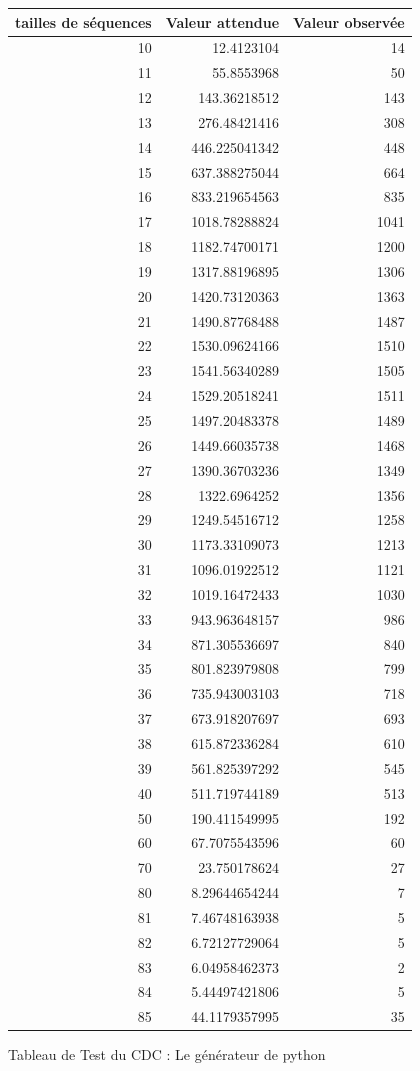 \documentclass[10pt,a4paper]{article}
\begin{document}
\newpage

\begin{figure}[h]
\centering
\begin{tabular}{|r|r|r|}
\hline
tailles de séquences & Valeur attendue & Valeur observée\\
\hline
10 & 12.4123104 & 14\\
11 & 55.8553968 & 50\\
12 & 143.36218512 & 143\\
13 & 276.48421416 & 308\\
14 & 446.225041342 & 448\\
15 & 637.388275044 & 664\\
16 & 833.219654563 & 835\\
17 & 1018.78288824 & 1041\\
18 & 1182.74700171 & 1200\\
19 & 1317.88196895 & 1306\\
20 & 1420.73120363 & 1363\\
21 & 1490.87768488 & 1487\\
22 & 1530.09624166 & 1510\\
23 & 1541.56340289 & 1505\\
24 & 1529.20518241 & 1511\\
25 & 1497.20483378 & 1489\\
26 & 1449.66035738 & 1468\\
27 & 1390.36703236 & 1349\\
28 & 1322.6964252 & 1356\\
29 & 1249.54516712 & 1258\\
30 & 1173.33109073 & 1213\\
31 & 1096.01922512 & 1121\\
32 & 1019.16472433 & 1030\\
33 & 943.963648157 & 986\\
34 & 871.305536697 & 840\\
35 & 801.823979808 & 799\\
36 & 735.943003103 & 718\\
37 & 673.918207697 & 693\\
38 & 615.872336284 & 610\\
39 & 561.825397292 & 545\\
40 & 511.719744189 & 513\\
50 & 190.411549995 & 192\\
60 & 67.7075543596 & 60\\
70 & 23.750178624 & 27\\
80 & 8.29644654244 & 7\\
81 & 7.46748163938 & 5\\
82 & 6.72127729064 & 5\\
83 & 6.04958462373 & 2\\
84 & 5.44497421806 & 5\\
85 & 44.1179357995 & 35\\
\hline
\end{tabular}
\caption{Tableau de Test du CDC : Le générateur de python }
\end{figure}
\newpage
\end{document}
